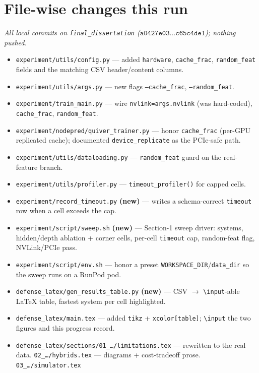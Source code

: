 \section*{File-wise changes this run}
\textit{All local commits on \texttt{final\_dissertation} ($\texttt{a0427e03}\ldots\texttt{c65c4de1}$); nothing pushed.}
\begin{itemize}
\item \texttt{experiment/utils/config.py} --- added \texttt{hardware}, \texttt{cache\_frac},
\texttt{random\_feat} fields and the matching CSV header/content columns.
\item \texttt{experiment/utils/args.py} --- new flags \texttt{--cache\_frac}, \texttt{--random\_feat}.
\item \texttt{experiment/train\_main.py} --- wire \texttt{nvlink=args.nvlink} (was hard-coded),
\texttt{cache\_frac}, \texttt{random\_feat}.
\item \texttt{experiment/nodepred/quiver\_trainer.py} --- honor \texttt{cache\_frac} (per-GPU
replicated cache); documented \texttt{device\_replicate} as the PCIe-safe path.
\item \texttt{experiment/utils/dataloading.py} --- \texttt{random\_feat} guard on the
real-feature branch.
\item \texttt{experiment/utils/profiler.py} --- \texttt{timeout\_profiler()} for capped cells.
\item \texttt{experiment/record\_timeout.py} \textbf{(new)} --- writes a schema-correct
\texttt{timeout} row when a cell exceeds the cap.
\item \texttt{experiment/script/sweep.sh} \textbf{(new)} --- Section-1 sweep driver:
systems, hidden/depth ablation + corner cells, per-cell \texttt{timeout} cap, random-feat flag,
NVLink/PCIe pass.
\item \texttt{experiment/script/env.sh} --- honor a preset \texttt{WORKSPACE\_DIR}/\texttt{data\_dir}
so the sweep runs on a RunPod pod.
\item \texttt{defense\_latex/gen\_results\_table.py} \textbf{(new)} --- CSV $\to$
\texttt{\textbackslash input}-able LaTeX table, fastest system per cell highlighted.
\item \texttt{defense\_latex/main.tex} --- added \texttt{tikz} + \texttt{xcolor[table]};
\texttt{\textbackslash input} the two figures and this progress record.
\item \texttt{defense\_latex/sections/01\_\ldots/limitations.tex} --- rewritten to the real data.
\texttt{02\_\ldots/hybrids.tex} --- diagrams + cost-tradeoff prose. \texttt{03\_\ldots/simulator.tex}

\end{itemize}
